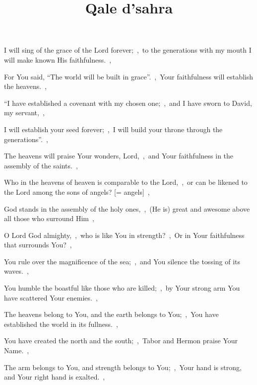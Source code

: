 \documentclass[12pt,twoside,a5paper]{article}
\begin{document}

\title{Qale d'sahra}
\inlinemaketitle


\begin{halfparskip}
   I will sing of the grace of the Lord forever;~\sep\ to the generations with my mouth I will make known His faithfulness.~\sep


  For You said, ``The world will be built in grace''.~\sep\ Your faithfulness will establish the heavens.~\sep

  ``I have established a covenant with my chosen one;~\sep\ and I have sworn to David, my servant,~\sep

  I will establish your seed forever;~\sep\ I will build your throne through the generations''.~\sep

  The heavens will praise Your wonders, Lord,~\sep\ and Your faithfulness in the assembly of the saints.~\sep

  Who in the heavens of heaven is comparable to the Lord,~\sep\ or can be likened to the Lord among the sons of angels? [= angels]~\sep

  God stands in the assembly of the holy ones,~\sep\ (He is) great and awesome above all those who surround Him~\sep

  O Lord God almighty,~\sep\ who is like You in strength?~\sep\ Or in Your faithfulness that surrounds You?~\sep

  You rule over the magnificence of the sea;~\sep\ and You silence the tossing of its waves.~\sep

  You humble the boastful like those who are killed;~\sep\ by Your strong arm You have scattered Your enemies.~\sep

  The heavens belong to You, and the earth belongs to You;~\sep\ You have established the world in its fullness.~\sep

  You have created the north and the south;~\sep\ Tabor and Hermon praise Your Name.~\sep

  The arm belongs to You, and strength belongs to You;~\sep\ Your hand is strong, and Your right hand is exalted.~\sep


\end{halfparskip}
\end{document}
